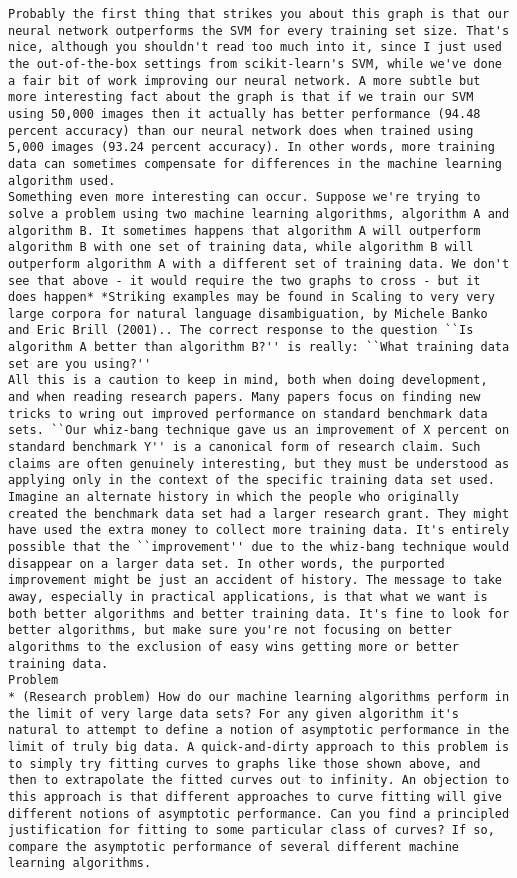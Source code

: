 \begin{lstlisting}
Probably the first thing that strikes you about this graph is that our neural network outperforms the SVM for every training set size. That's nice, although you shouldn't read too much into it, since I just used the out-of-the-box settings from scikit-learn's SVM, while we've done a fair bit of work improving our neural network. A more subtle but more interesting fact about the graph is that if we train our SVM using 50,000 images then it actually has better performance (94.48 percent accuracy) than our neural network does when trained using 5,000 images (93.24 percent accuracy). In other words, more training data can sometimes compensate for differences in the machine learning algorithm used.
Something even more interesting can occur. Suppose we're trying to solve a problem using two machine learning algorithms, algorithm A and algorithm B. It sometimes happens that algorithm A will outperform algorithm B with one set of training data, while algorithm B will outperform algorithm A with a different set of training data. We don't see that above - it would require the two graphs to cross - but it does happen* *Striking examples may be found in Scaling to very very large corpora for natural language disambiguation, by Michele Banko and Eric Brill (2001).. The correct response to the question ``Is algorithm A better than algorithm B?'' is really: ``What training data set are you using?''
All this is a caution to keep in mind, both when doing development, and when reading research papers. Many papers focus on finding new tricks to wring out improved performance on standard benchmark data sets. ``Our whiz-bang technique gave us an improvement of X percent on standard benchmark Y'' is a canonical form of research claim. Such claims are often genuinely interesting, but they must be understood as applying only in the context of the specific training data set used. Imagine an alternate history in which the people who originally created the benchmark data set had a larger research grant. They might have used the extra money to collect more training data. It's entirely possible that the ``improvement'' due to the whiz-bang technique would disappear on a larger data set. In other words, the purported improvement might be just an accident of history. The message to take away, especially in practical applications, is that what we want is both better algorithms and better training data. It's fine to look for better algorithms, but make sure you're not focusing on better algorithms to the exclusion of easy wins getting more or better training data.
Problem
* (Research problem) How do our machine learning algorithms perform in the limit of very large data sets? For any given algorithm it's natural to attempt to define a notion of asymptotic performance in the limit of truly big data. A quick-and-dirty approach to this problem is to simply try fitting curves to graphs like those shown above, and then to extrapolate the fitted curves out to infinity. An objection to this approach is that different approaches to curve fitting will give different notions of asymptotic performance. Can you find a principled justification for fitting to some particular class of curves? If so, compare the asymptotic performance of several different machine learning algorithms. 

\end{lstlisting}
